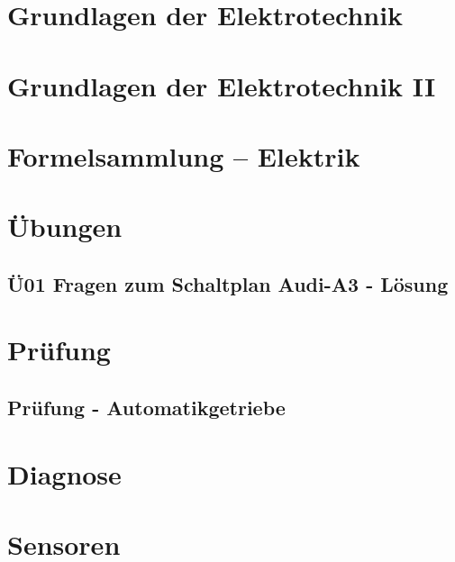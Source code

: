 



\chapter{Grundlagen der Elektrotechnik}

\chapter{Grundlagen der Elektrotechnik II}


\chapter{Formelsammlung -- Elektrik}


\chapter{Übungen}
\section{Ü01 Fragen zum Schaltplan Audi-A3 - Lösung}


\chapter{Prüfung}
\section{Prüfung - Automatikgetriebe}



\chapter{Diagnose}

\chapter{Sensoren}




